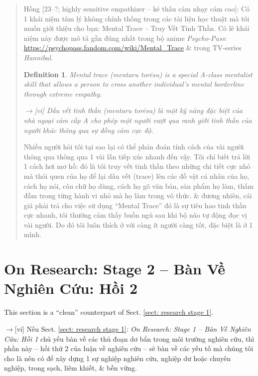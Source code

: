 \documentclass[12pt,oneside]{book}
\newtheorem{definition}{Definition}[section]
\begin{document}
\begin{quote}
	{\sf Hồng [23--?; highly sensitive empathizer -- kẻ thấu cảm nhạy cảm cao]}: Có 1 khái niệm tâm lý không chính thống trong các tài liệu học thuật mà tôi muốn giới thiệu cho bạn: Mental Trace -- Truy Vết Tinh Thần. Có lẽ khái niệm này được mô tả gần đúng nhất trong bộ anime {\it Psycho-Pass}: \url{https://psychopass.fandom.com/wiki/Mental_Trace} \& trong TV-series {\it Hannibal}.
	
	\begin{definition}
		\emph{Mental trace} (mentaru torēsu) is a special A-class mentalist skill that allows a person to cross another individual's mental borderline through extreme empathy.
		
		{\sf[en]$\to$[vi]} \emph{Dấu vết tinh thần} (mentaru torēsu) là một kỹ năng đặc biệt của nhà ngoại cảm cấp A cho phép một người vượt qua ranh giới tinh thần của người khác thông qua sự đồng cảm cực độ.
	\end{definition}
	
	Nhiều người hỏi tôi tại sao lại có thể phán đoán tính cách của vài người thông qua thông qua 1 vài lần tiếp xúc nhanh đến vậy. Tôi chỉ biết trả lời 1 cách hơi mơ hồ: đó là tôi truy vết tinh thần theo những chi tiết cực nhỏ mà thói quen của họ để lại dấu vết (trace) lên các đồ vật cá nhân của họ, cách họ nói, câu chữ họ dùng, cách họ gõ văn bản, sản phẩm họ làm, thấm đẫm trong từng hành vi nhỏ mà họ làm trong vô thức. \& đương nhiên, cái giá phải trả cho việc sử dụng ``Mental Trace'' đó là sự tiêu hao tinh thần cực nhanh, tôi thường cảm thấy buồn ngủ sau khi bộ não tự động đọc vị vài người. Do đó tôi luôn thích ở với càng ít người càng tốt, đặc biệt là ở 1 mình.
\end{quote}


\chapter{On Research: Stage 2 -- Bàn Về Nghiên Cứu: Hồi 2}
\label{sect: research stage 2}
\minitoc
This section is a ``clean'' counterpart of Sect. \ref{sect: research stage 1}.

{\sf[en]$\to$[vi]} Nếu Sect. \ref{sect: research stage 1}: {\it On Research: Stage 1 -- Bàn Về Nghiên Cứu: Hồi 1} chủ yếu bàn về các thủ đoạn dơ bẩn trong môi trường nghiên cứu, thì phần này -- hồi thứ 2 của luận về nghiên cứu -- sẽ bàn về các yếu tố mà chúng tôi cho là nên có để xây dựng 1 sự nghiệp nghiên cứu, nghiệp dư hoặc chuyên nghiệp, trong sạch, liêm khiết, \& bền vững.
\end{document}

